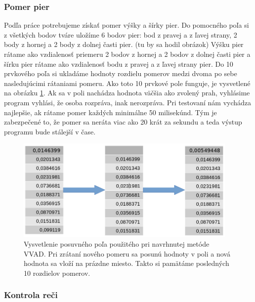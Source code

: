 \subsubsection{Pomer pier}\label{pomerPier}

Podľa práce \cite{aoki2007voice} potrebujeme získať pomer výšky a šírky pier.
Do pomocného poľa si z všetkých bodov tváre uložíme 6 bodov pier: bod z pravej a z ľavej strany, 2 body z hornej a 2 body z dolnej časti pier. 
(tu by sa hodil obrázok)
Výšku pier rátame ako vzdialenosť priemeru 2 bodov z hornej a 2 bodov z dolnej časti pier a šírku pier rátame ako vzdialenosť bodu z pravej a z ľavej strany pier.
Do 10 prvkového poľa si ukladáme hodnoty rozdielu pomerov medzi dvoma po sebe nasledujúcimi rátaniami pomeru. 
Ako toto 10 prvkové pole funguje, je vysvetlené na obrázku \ref{pic-vysvetleniePosuvnehoPola}.
Ak sa v poli nachádza hodnota väčšia ako zvolený prah, vyhlásime program vyhlási, že osoba rozpráva, inak nerozpráva.
Pri testovaní nám vychádza najlepšie, ak rátame pomer každých minimálne 50 milisekúnd.
Tým je zabezpečené to, že pomer sa neráta viac ako 20 krát za sekundu a teda výstup programu bude stálejší v čase.

\begin{figure}[H]
	\begin{center}
		\includegraphics[height=5cm]{pics/vysvetleniePosuvnehoPola.png}
		\caption{Vysvetlenie posuvného poľa použitého pri navrhnutej metóde VVAD. 
		Pri zrátaní nového pomeru sa posunú hodnoty v poli a nová hodnota sa vloží na prázdne miesto. 
		Takto si pamätáme posledných 10 rozdielov pomerov.}
		\label{pic-vysvetleniePosuvnehoPola}
	\end{center}
\end{figure}

\subsubsection{Kontrola reči}\label{kontrolaReci}


